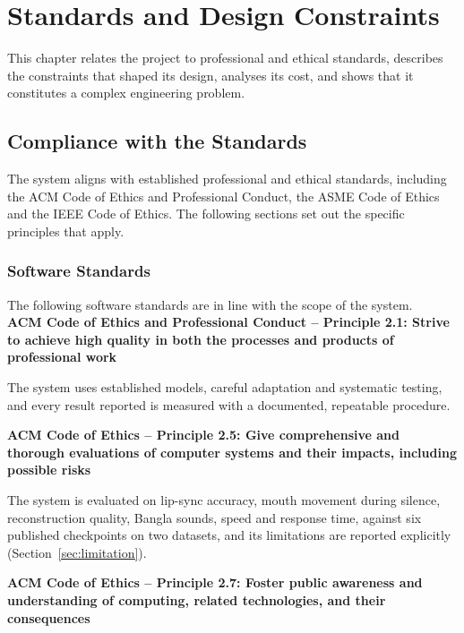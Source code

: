 \chapter{Standards and Design Constraints}

This chapter relates the project to professional and ethical standards, describes the constraints that shaped its design, analyses its cost, and shows that it constitutes a complex engineering problem.

\section{Compliance with the Standards}
The system aligns with established professional and ethical standards, including the ACM Code of Ethics and Professional Conduct, the ASME Code of Ethics and the IEEE Code of Ethics. The following sections set out the specific principles that apply.

\subsection{Software Standards}
The following software standards are in line with the scope of the system.\\


\textbf{ACM Code of Ethics and Professional Conduct -- Principle 2.1: Strive to achieve high quality in both the processes and products of professional work}

\noindent
The system uses established models, careful adaptation and systematic testing, and every result reported is measured with a documented, repeatable procedure.

\vspace{0.5cm}


\textbf{ACM Code of Ethics -- Principle 2.5: Give comprehensive and thorough evaluations of computer systems and their impacts, including possible risks}

\noindent
The system is evaluated on lip-sync accuracy, mouth movement during silence, reconstruction quality, Bangla sounds, speed and response time, against six published checkpoints on two datasets, and its limitations are reported explicitly (Section~\ref{sec:limitation}).

\vspace{0.5cm}


\textbf{ACM Code of Ethics -- Principle 2.7: Foster public awareness and understanding of computing, related technologies, and their consequences}

